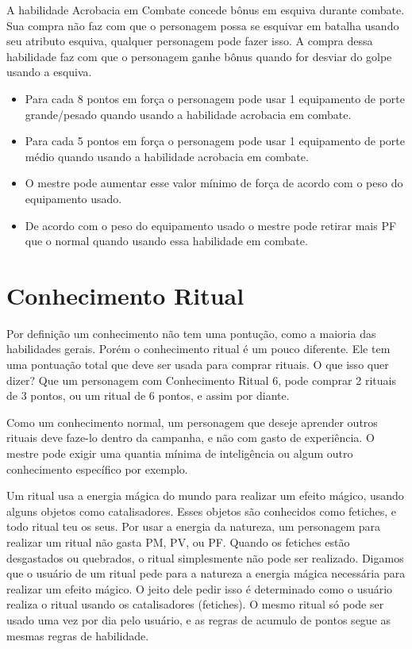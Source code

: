 A habilidade Acrobacia em Combate concede bônus em esquiva durante combate. Sua compra não faz com que o personagem possa se esquivar em batalha usando seu atributo esquiva, qualquer personagem pode fazer isso. A compra dessa habilidade faz com que o personagem ganhe bônus quando for desviar do golpe usando a esquiva.

\begin{itemize}
	\item Para cada 8 pontos em força o personagem pode usar 1 equipamento de porte grande/pesado quando usando a habilidade acrobacia em combate.
	\item Para cada 5 pontos em força o personagem pode usar 1 equipamento de porte médio quando usando a habilidade acrobacia em combate.
	\item O mestre pode aumentar esse valor mínimo de força de acordo com o peso do equipamento usado.
	\item De acordo com o peso do equipamento usado o mestre pode retirar mais PF que o normal quando usando essa habilidade em combate.					
\end{itemize}

 
 \section{Conhecimento Ritual}
 
Por definição um conhecimento não tem uma pontução, como a maioria das habilidades gerais. Porém o conhecimento ritual é um pouco diferente. Ele tem uma pontuação total que deve ser usada para comprar rituais. O que isso quer dizer? Que um personagem com Conhecimento Ritual 6, pode comprar 2 rituais de 3 pontos, ou um ritual de 6 pontos, e assim por diante.

Como um conhecimento normal, um personagem que deseje aprender outros rituais deve faze-lo dentro da campanha, e não com gasto de experiência. O mestre pode exigir uma quantia mínima de inteligência ou algum outro conhecimento específico por exemplo.

Um ritual usa a energia mágica do mundo para realizar um efeito mágico, usando alguns objetos como catalisadores. Esses objetos são conhecidos como fetiches, e todo ritual teu os seus. Por usar a energia da natureza, um personagem para realizar um ritual não gasta PM, PV, ou PF. Quando os fetiches estão desgastados ou quebrados, o ritual simplesmente não pode ser realizado. Digamos que o usuário de um ritual pede para a natureza a energia mágica necessária para realizar um efeito mágico. O jeito dele pedir isso é determinado como o usuário realiza o ritual usando os catalisadores (fetiches). O mesmo ritual só pode ser usado uma vez por dia  pelo usuário, e as regras de acumulo de pontos segue as mesmas regras de habilidade.
 
